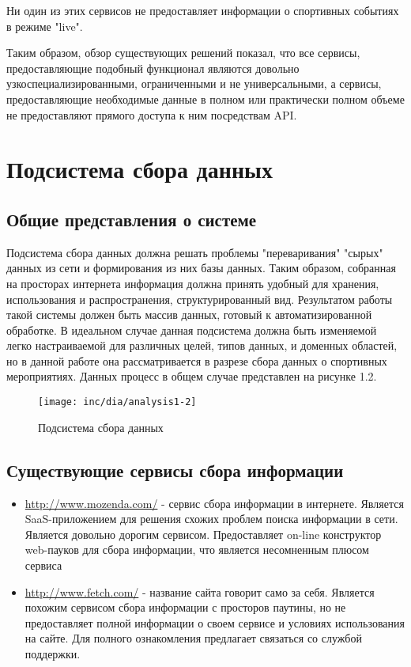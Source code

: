 Ни один из этих сервисов не предоставляет информации о спортивных событиях в режиме "live".

Таким образом, обзор существующих решений показал, что все сервисы, предоставляющие подобный функционал являются довольно узкоспециализированными, ограниченными и не универсальными, а сервисы, предоставляющие необходимые данные в полном или практически полном объеме не предоставляют прямого доступа к ним посредствам API. 

\section{Подсистема сбора данных}
\subsection{Общие представления о системе}

Подсистема сбора данных должна решать проблемы "переваривания" "сырых" данных из сети и формирования из них базы данных. Таким образом, собранная на просторах интернета информация должна принять удобный для хранения, использования и распространения, структурированный вид. Результатом работы такой системы должен быть массив данных, готовый к автоматизированной обработке. В идеальном случае данная подсистема должна быть изменяемой легко настраиваемой для различных целей, типов данных, и доменных областей, но в данной работе она рассматривается в разрезе сбора данных о спортивных мероприятиях. Данных процесс в общем случае представлен на рисунке 1.2.
\begin{figure}
  \centering
  \texttt{[image: inc/dia/analysis1-2]}
  \caption{Подсистема сбора данных}
  \label{fig:fig02}
\end{figure}

\subsection{Существующие сервисы сбора информации}

\begin{itemize}
\item \url{http://www.mozenda.com/} - сервис сбора информации в интернете. Является SaaS-приложением для решения схожих проблем поиска информации в сети. Является довольно дорогим сервисом. Предоставляет on-line конструктор web-пауков для сбора информации, что является несомненным плюсом сервиса
\item \url{http://www.fetch.com/} - название сайта говорит само за себя. Является похожим сервисом сбора информации с просторов паутины, но не предоставляет полной информации о своем сервисе и условиях использования на сайте. Для полного ознакомления предлагает связаться со службой поддержки.
\end{itemize}


